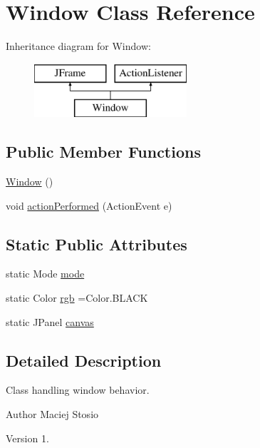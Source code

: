 \hypertarget{class_window}{}\section{Window Class Reference}
\label{class_window}
Inheritance diagram for Window\+:\begin{figure}[H]
\begin{center}
\leavevmode
\includegraphics[height=2.000000cm]{class_window}
\end{center}
\end{figure}
\subsection*{Public Member Functions}
\begin{DoxyCompactItemize}
\item 
\hyperlink{class_window_ad0552903a3d5b009c0d882f9ad2571ff}{Window} ()
\item 
void \hyperlink{class_window_ab37b919572708606bcde411bf83d847a}{action\+Performed} (Action\+Event e)
\end{DoxyCompactItemize}
\subsection*{Static Public Attributes}
\begin{DoxyCompactItemize}
\item 
static Mode \hyperlink{class_window_add04f4568154de76f0e5359ab846a3cd}{mode}
\item 
static Color \hyperlink{class_window_ae9bd15543adc0d59f94321348c0ee8f7}{rgb} =Color.\+B\+L\+A\+CK
\item 
static J\+Panel \hyperlink{class_window_a212252a97adff44bb60a91a6c1a89975}{canvas}
\end{DoxyCompactItemize}


\subsection{Detailed Description}
Class handling window behavior. \begin{DoxyAuthor}{Author}
Maciej Stosio 
\end{DoxyAuthor}
\begin{DoxyVersion}{Version}
1. 
\end{DoxyVersion}


